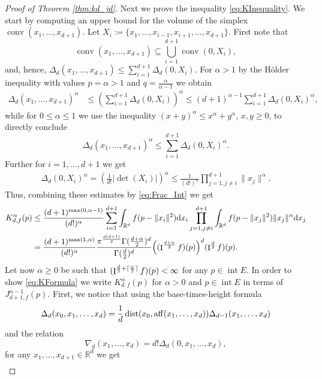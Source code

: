 \documentclass[11pt,a4paper]{article}
\theoremstyle{plain}
\theoremstyle{definition}
\theoremstyle{remark}
\newcommand{\dist}{\mathop{\mathrm{dist}}\nolimits}
\def\RR{\mathbb{R}}
\newcommand{\dd}{{\rm d}}
\newcommand{\conv}{\mathop{\mathrm{conv}}\nolimits}
\newcommand{\frI}{\mathop{\mathrm{I}}\nolimits}
\newcommand{\aff}{\mathop{\mathrm{aff}}\nolimits}
\newcommand{\inter}{\operatorname{int}}
\begin{document}
\begin{proof}[Proof of Theorem \ref{thm:kd_jd}]
    Next we prove the inequality \eqref{eq:KInequality}. We start by computing an upper bound for the volume of the simplex $\conv(x_1,\dots,x_{d+1})$. Let $X_i:=\{x_1,\dots,x_{i-1},x_{i+1},\dots,x_{d+1}\}$. First note that 
    \[
        \conv(x_1,\dots,x_{d+1})\subseteq \bigcup_{i=1}^{d+1} \conv(0,X_i),
    \]
    and, hence, $\Delta_d(x_1,\dots,x_{d+1}) \le \sum_{i=1}^{d+1} \Delta_d(0,X_i)$.
    For $\alpha> 1$ by the Hölder inequality with values $p=\alpha>1$ and $q=\frac{\alpha}{\alpha-1}$ we obtain
    \begin{align*}
        \Delta_d(x_1,\dots,x_{d+1})^{\alpha} &\le \left(\sum_{i=1}^{d+1} \Delta_d(0,X_i)\right)^{\alpha}\le (d+1)^{\alpha-1} \sum_{i=1}^{d+1} \Delta_d(0,X_i)^{\alpha},   
    \end{align*}
    while for $0\leq \alpha\leq 1$ we use the inequality $(x+y)^{\alpha}\leq x^{\alpha}+y^{\alpha}$, $x,y\ge 0$, to directly conclude 
    $$
        \Delta_d(x_1,\dots,x_{d+1})^{\alpha}\leq \sum_{i=1}^{d+1} \Delta_d(0,X_i)^{\alpha}.
    $$
    Further for $i=1,\dots,d+1$ we get
    \begin{align*}
        \Delta_d(0,X_i)^{\alpha} = \left(\frac{1}{d!}|\det(X_i)|\right)^{\alpha} \le \frac{1}{(d!)^{\alpha}}\prod_{j=1,j\neq i}^{d+1}\|x_j\|^{\alpha}.
    \end{align*}
    Thus, combining these estimates by \eqref{eq:Frac_Int} we get
    \begin{align*}
        K_{d,f}^{\alpha}(p)&\leq {(d+1)^{\max(0,\alpha-1)}\over (d!)^{\alpha}}\sum_{i=1}^{d+1}\int_{\RR^d}f(p-\|x_i\|^2)\dd x_i\prod_{j=1,j\neq i}^{d+1}\int_{\RR^d}f(p-\|x_j\|^2)\|x_j\|^{\alpha}\dd x_j\\
        &={(d+1)^{\max(1,\alpha)}\over (d!)^{\alpha}}{\pi^{d(d+1)\over 2}\Gamma({d+\alpha\over 2})^d\over \Gamma({d\over 2})^d}\Big((\frI^{{d+\alpha\over 2}}f)(p)\Big)^d(\frI^{{d\over 2}}f)(p).
    \end{align*}
    Let now $\alpha\ge 0$ be such that $(\frI^{{d\over 2}+\lceil{\alpha\over 2}\rceil}f)(p)<\infty$ for any $p\in \inter E$. In order to show \eqref{eq:KFormula} we write $K_{d,f}^\alpha(p)$ for $\alpha>0$ and $p\in \inter E$ in terms of $J_{d+1,f}^{\alpha-1}(p)$.
    First, we notice that using the base-times-height formula 
    $$
        \Delta_d(x_0,x_1,\ldots,x_d)={1\over d}\dist(x_0,\aff(x_1,\ldots,x_d))\Delta_{d-1}(x_1,\ldots,x_d)
    $$
    and the relation \cite[Equation (7.6)]{SW}
    $$
        \nabla_d(x_1,\dots,x_d)=d!\Delta_{d}(0,x_1,\dots,x_d),
    $$
    for any $x_1,\dots,x_{d+1}\in \RR^d$ we get 
    \begin{align*}

\end{align*}
\end{proof}
\end{document}

